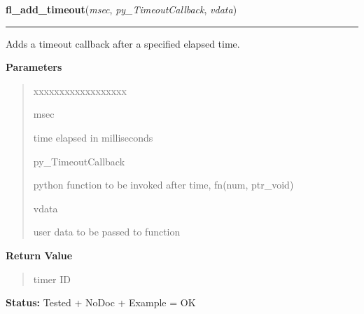 \hspace{.8\funcindent}\begin{boxedminipage}{\funcwidth}

    \raggedright \textbf{fl\_add\_timeout}(\textit{msec}, \textit{py\_TimeoutCallback}, \textit{vdata})

    \vspace{-1.5ex}

    \rule{\textwidth}{0.5\fboxrule}
\setlength{\parskip}{2ex}
    Adds a timeout callback after a specified elapsed time.

\setlength{\parskip}{1ex}
      \textbf{Parameters}
      \vspace{-1ex}

      \begin{quote}
        \begin{Ventry}{xxxxxxxxxxxxxxxxxx}

          \item[msec]

          time elapsed in milliseconds

          \item[py\_TimeoutCallback]

          python function to be invoked after time, fn(num, ptr\_void)

          \item[vdata]

          user data to be passed to function

        \end{Ventry}

      \end{quote}

      \textbf{Return Value}
    \vspace{-1ex}

      \begin{quote}
      timer ID

      \end{quote}

\textbf{Status:} Tested + NoDoc + Example = OK



    \end{boxedminipage}

    \label{xformslib:library:fl_remove_timeout}

    \vspace{0.5ex}

